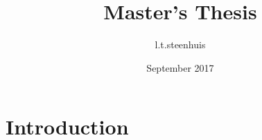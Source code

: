 \documentclass{article}
\title{Master's Thesis}
\author{l.t.steenhuis }
\date{September 2017}
\begin{document}
\maketitle

\section{Introduction}
\end{document}
